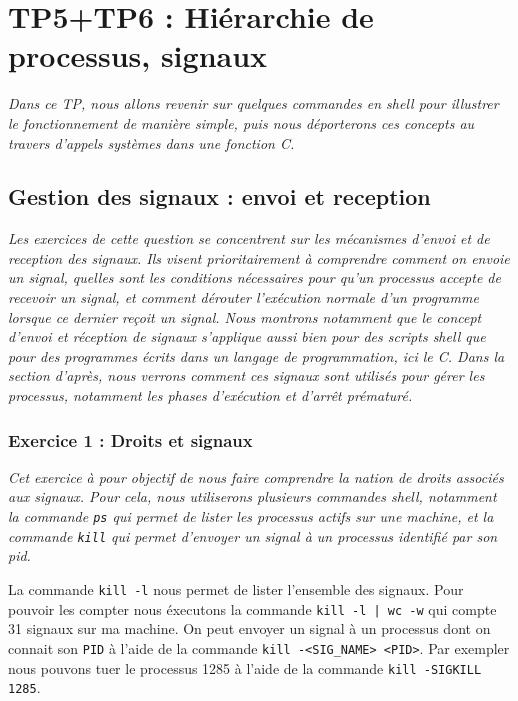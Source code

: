\chapter{TP5+TP6 : Hiérarchie de processus, signaux}
\textit{Dans ce TP, nous allons revenir sur quelques commandes en shell pour illustrer le fonctionnement de manière simple, puis nous déporterons ces concepts au travers d’appels systèmes dans une fonction C.}

\section{Gestion des signaux : envoi et reception}
\textit{Les exercices de cette question se concentrent sur les mécanismes d’envoi et de reception des signaux. Ils visent prioritairement à comprendre comment on envoie un signal, quelles sont les conditions nécessaires pour qu’un processus accepte de recevoir un signal, et comment dérouter l’exécution normale d’un programme lorsque ce dernier reçoit un signal. Nous montrons notamment que le concept d’envoi et réception de signaux s’applique aussi bien pour des scripts shell que pour des programmes écrits dans un langage de programmation, ici le C. Dans la section d’après, nous verrons comment ces signaux sont utilisés pour gérer les processus, notamment les phases d’exécution et d’arrêt prématuré.}

\subsection{Exercice 1 : Droits et signaux}
\textit{Cet exercice à pour objectif de nous faire comprendre la nation de droits associés aux signaux. Pour cela, nous utiliserons plusieurs commandes shell, notamment la commande \texttt{ps} qui permet de lister les processus actifs sur une machine, et la commande \texttt{kill} qui permet d’envoyer un signal à un processus identifié par son pid.}

La commande \texttt{kill -l} nous permet de lister l'ensemble des signaux. Pour pouvoir les compter nous éxecutons la commande \texttt{kill -l | wc -w} qui compte 31 signaux sur ma machine. On peut envoyer un signal à un processus dont on connait son \texttt{PID} à l'aide de la commande \texttt{kill -<SIG_NAME> <PID>}. Par exempler nous pouvons tuer le processus 1285 à l'aide de la commande \texttt{kill -SIGKILL 1285}.


